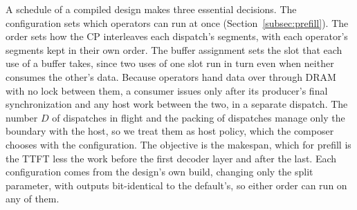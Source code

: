 \label{subsec:formulation}
A schedule of a compiled design makes three essential decisions.
The configuration sets which operators can run at once (Section~\ref{subsec:prefill}).
The order sets how the CP interleaves each dispatch's segments, with each operator's segments kept in their own order.
The buffer assignment sets the slot that each use of a buffer takes, since two uses of one slot run in turn even when neither consumes the other's data.
Because operators hand data over through DRAM with no lock between them, a consumer issues only after its producer's final synchronization and any host work between the two, in a separate dispatch.
The number $D$ of dispatches in flight and the packing of dispatches manage only the boundary with the host, so we treat them as host policy, which the composer chooses with the configuration.
The objective is the makespan, which for prefill is the TTFT less the work before the first decoder layer and after the last.
Each configuration comes from the design's own build, changing only the split parameter, with outputs bit-identical to the default's, so either order can run on any of them.

